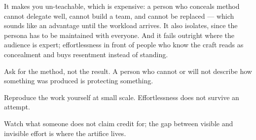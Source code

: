 \begin{failure}
It makes you un-teachable, which is expensive: a person who conceals method cannot delegate well, cannot build a team, and cannot be replaced --- which sounds like an advantage until the workload arrives. It also isolates, since the persona has to be maintained with everyone. And it fails outright where the audience is expert; effortlessness in front of people who know the craft reads as concealment and buys resentment instead of standing.
\end{failure}

\begin{countermeasures}
  \item Ask for the method, not the result. A person who cannot or will not describe how something was produced is protecting something.
  \item Reproduce the work yourself at small scale. Effortlessness does not survive an attempt.
  \item Watch what someone does not claim credit for; the gap between visible and invisible effort is where the artifice lives.
\end{countermeasures}

\seesources
{}
